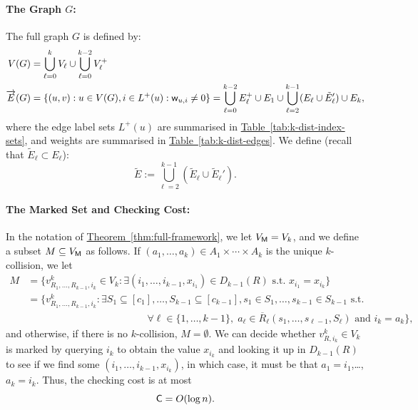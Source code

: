 \documentclass{theoretics}
\newcommand{\thm}[1]{\hyperref[thm:#1]{Theorem~\ref*{thm:#1}}}
\newcommand{\tabl}[1]{\hyperref[tab:#1]{Table~\ref*{tab:#1}}}
\renewcommand{\>}{\rangle}
\newcommand{\<}{\langle}
\renewcommand{\(}{\left(}
\renewcommand{\)}{\right)}
\def\w{{\sf w}}
\begin{document}
\paragraph{The Graph $G$:} The full graph $G$ is defined by:
\begin{align*}
V(G)&=\bigcup_{\ell=0}^{k} V_{\ell}\cup \bigcup_{\ell=0}^{k-2} V_{\ell}^+\\
\overrightarrow{E}(G) &= \{(u,v):u\in V(G), i\in L^+(u):\w_{u,i}\neq 0\}=\bigcup_{\ell=0}^{k-2} E_{\ell}^+\cup E_1 \cup \bigcup_{\ell=2}^{k-1} (E_{\ell}\cup \tilde{E}_{\ell}')\cup E_k,
\end{align*}
where the edge label sets $L^+(u)$ are summarised in \tabl{k-dist-index-sets}, and weights are summarised in \tabl{k-dist-edges}. We define (recall that $\tilde{E}_{\ell}\subset E_{\ell}$): 
\begin{equation}
\tilde{E}:=\bigcup_{\ell=2}^{k-1}(\tilde{E}_{\ell}\cup\tilde{E}_{\ell}').\label{eq:k-dist-tilde-E}
\end{equation}



\paragraph{The Marked Set and Checking Cost:}  In the notation of \thm{full-framework}, we let $V_{\sf M}=V_k$, and we define a subset $M\subseteq V_{\sf M}$ as follows. 
If $(a_1,\dots,a_k)\in A_1\times \cdots \times A_k$ is the unique $k$-collision, we let 
\begin{equation}
\begin{split}
	M &= \big\{v^{k}_{R_1,\dots,R_{k-1},i_k} \in V_{k}: \exists (i_1,\dots,i_{k-1},x_{i_1})\in D_{k-1}(R)\mbox{ s.t. }x_{i_1}=x_{i_k}\}\\
&= \big\{v^k_{R_1,\dots,R_{k-1},i_k}: \exists 
S_{1} \subseteq [c_{1}],\dots,S_{k-1} \subseteq [c_{k-1}], s_1 \in S_1,\dots,s_{k-1} \in S_{k-1} \text{ s.t. }\\
	&\qquad\qquad\qquad\qquad\qquad\qquad \forall \ell \in \{1,\dots,k-1\},\; a_{\ell} \in \overline{R}_{\ell}(s_1,\dots,s_{\ell-1},S_{\ell})\mbox{ and }i_k = a_k\big\},
\end{split}\label{eq:k-dist-M}
\end{equation}
and otherwise, if there is no $k$-collision, $M=\emptyset$. We can decide whether $v^{k}_{R,i_k} \in V_{k}$ is marked by querying $i_k$ to obtain the value $x_{i_k}$ and looking it up in $D_{k-1}(R)$ to see if we find some $(i_1,\dots,i_{k-1},x_{i_k})$, in which case, it must be that $a_1=i_1$,\dots,$a_k=i_k$. Thus, the checking cost is at most
\begin{equation}
	{\sf C}=O(\log n).\label{eq:k-dist-C}
\end{equation}
\end{document}
